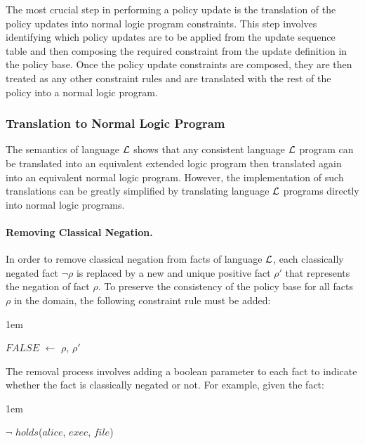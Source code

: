 \documentclass[glov2,twocolumn,final]{svjour2}
\newenvironment{vquote}
  {\begin{list}{}{\leftmargin 1em}\item[]}
  {\end{list}}
\begin{document}
        The most crucial step in performing a policy update is the translation
        of the policy updates into normal logic program constraints. This step
        involves identifying which policy updates are to be applied from the
        update sequence table and then composing the required constraint from
        the update definition in the policy base. Once the policy update
        constraints are composed, they are then treated as any other
        constraint rules and are translated with the rest of the policy into
        a normal logic program.

      \subsubsection{Translation to Normal Logic Program}

        The semantics of language ${\cal L}$ shows that any consistent language
        ${\cal L}$ program can be translated into an equivalent extended logic
        program then translated again into an equivalent normal logic program.
        However, the implementation of such translations can be greatly
        simplified by translating language ${\cal L}$ programs directly into
        normal logic programs.

        \paragraph{Removing Classical Negation.}

          In order to remove classical negation from facts of language
          ${\cal L}$, each classically negated fact $\lnot$$\rho$ is replaced
          by a new and unique positive fact $\rho'$ that represents the
          negation of fact $\rho$. To preserve the consistency of the policy
          base for all facts $\rho$ in the domain, the following constraint
          rule must be added:

          \begin{vquote}
            $FALSE$ $\leftarrow$ $\rho$, $\rho'$
          \end{vquote}

          The removal process involves adding a boolean parameter to each fact
          to indicate whether the fact is classically negated or not. For
          example, given the fact:

          \begin{vquote}
            $\lnot$ $holds$($alice$, $exec$, $file$)
          \end{vquote}
\end{document}
